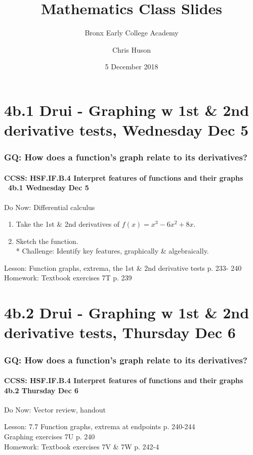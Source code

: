 \documentclass{beamer}
\title{Mathematics Class Slides}
\subtitle{Bronx Early College Academy}
\author{Chris Huson}
\date{5 December 2018}
\begin{document}
\frame{\titlepage}


\section{4b.1 Drui - Graphing w 1st \& 2nd derivative tests, Wednesday Dec 5}
  \frame
  {\frametitle{GQ: How does a function's graph relate to its derivatives?}
    \framesubtitle{CCSS: HSF.IF.B.4 Interpret features of functions and their graphs \  \alert{4b.1 Wednesday Dec 5}}

    \begin{block}{Do Now: Differential calculus}
    \begin{enumerate}
        \item Take the 1st \& 2nd derivatives of $f(x)=x^3-6x^2+8x$.
        \item Sketch the function.\\*
        Challenge: Identify key features, graphically \& algebraically.
    \end{enumerate}
    \end{block}
    Lesson: Function graphs, extrema, the 1st \& 2nd derivative tests p. 233- 240\\ \bigskip
    Homework: Textbook exercises 7T p. 239
  }

\section{4b.2 Drui - Graphing w 1st \& 2nd derivative tests, Thursday Dec 6}
  \frame
  {\frametitle{GQ: How does a function's graph relate to its derivatives?}
    \framesubtitle{CCSS: HSF.IF.B.4 Interpret features of functions and their graphs \quad \alert{4b.2 Thursday Dec 6}}

    \begin{block}{Do Now: Vector review, handout}
    \end{block}
    Lesson: 7.7 Function graphs, extrema at endpoints p. 240-244\\
    Graphing exercises 7U p. 240\\ \bigskip
    Homework: Textbook exercises 7V \& 7W p. 242-4
  }
\end{document}
